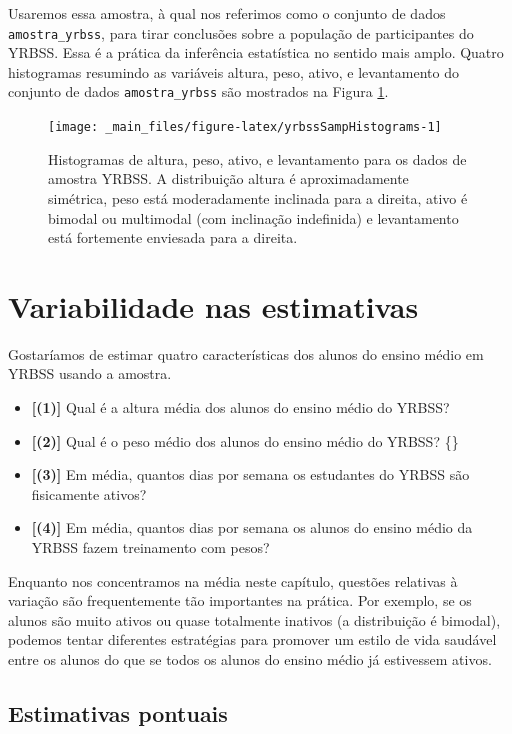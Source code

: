 \documentclass[
]{book}
\theoremstyle{definition}
\theoremstyle{definition}
\theoremstyle{definition}
\theoremstyle{definition}
\theoremstyle{remark}
\begin{document}
Usaremos essa amostra, à qual nos referimos como o conjunto de dados \texttt{amostra\_yrbss}, para tirar conclusões sobre a população de participantes do YRBSS. Essa é a prática da inferência estatística no sentido mais amplo. Quatro histogramas resumindo as variáveis altura, peso, ativo, e levantamento do conjunto de dados \texttt{amostra\_yrbss} são mostrados na Figura \ref{fig:yrbssSampHistograms}.

\begin{figure}
\texttt{[image: \_main\_files/figure-latex/yrbssSampHistograms-1]} \caption{Histogramas de altura, peso, ativo, e levantamento para os dados de amostra YRBSS. A distribuição altura é aproximadamente simétrica, peso está moderadamente inclinada para a direita, ativo é bimodal ou multimodal (com inclinação indefinida) e levantamento está fortemente enviesada para a direita.}\label{fig:yrbssSampHistograms}
\end{figure}

\hypertarget{variabilityEstimates}{%
\section{Variabilidade nas estimativas}\label{variabilityEstimates}}

Gostaríamos de estimar quatro características dos alunos do ensino médio em YRBSS usando a amostra.

\begin{itemize}
\item
  \textbf{{[}(1){]}} Qual é a altura média dos alunos do ensino médio do YRBSS?
\item
  \textbf{{[}(2){]}} Qual é o peso médio dos alunos do ensino médio do YRBSS? \{\}
\item
  \textbf{{[}(3){]}} Em média, quantos dias por semana os estudantes do YRBSS são fisicamente ativos?
\item
  \textbf{{[}(4){]}} Em média, quantos dias por semana os alunos do ensino médio da YRBSS fazem treinamento com pesos?
\end{itemize}

Enquanto nos concentramos na média neste capítulo, questões relativas à variação são frequentemente tão importantes na prática. Por exemplo, se os alunos são muito ativos ou quase totalmente inativos (a distribuição é bimodal), podemos tentar diferentes estratégias para promover um estilo de vida saudável entre os alunos do que se todos os alunos do ensino médio já estivessem ativos.

\hypertarget{pointEstimates}{%
\subsection{Estimativas pontuais}\label{pointEstimates}}
\end{document}
